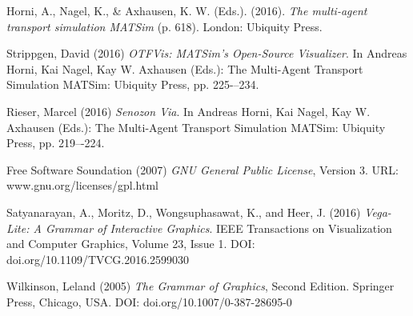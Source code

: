 \documentclass[3p,times,procedia]{elsarticle}
\begin{document}
%


\begin{thebibliography}{1}

  Horni, A., Nagel, K., \& Axhausen, K. W. (Eds.). (2016). \textit{The multi-agent transport simulation MATSim} (p. 618). London: Ubiquity Press.

  Strippgen, David (2016) \textit{OTFVis: MATSim’s Open-Source Visualizer}. In Andreas Horni, Kai Nagel, Kay W. Axhausen (Eds.): The Multi-Agent Transport Simulation MATSim: Ubiquity Press, pp. 225-–234.

  Rieser, Marcel (2016) \textit{Senozon Via}. In Andreas Horni, Kai Nagel, Kay W. Axhausen (Eds.): The Multi-Agent Transport Simulation MATSim: Ubiquity Press, pp. 219–-224.

  Free Software Soundation (2007) \textit{GNU General Public License}, Version 3.
  URL: www.gnu.org/licenses/gpl.html

  Satyanarayan, A., Moritz, D., Wongsuphasawat, K., and Heer, J. (2016) \textit{Vega-Lite: A Grammar of Interactive Graphics}. IEEE Transactions on Visualization and Computer Graphics, Volume 23, Issue 1. DOI: doi.org/10.1109/TVCG.2016.2599030

  Wilkinson, Leland (2005) \textit{The Grammar of Graphics}, Second Edition. Springer Press, Chicago, USA. DOI: doi.org/10.1007/0-387-28695-0

  \end{thebibliography}
\end{document}
